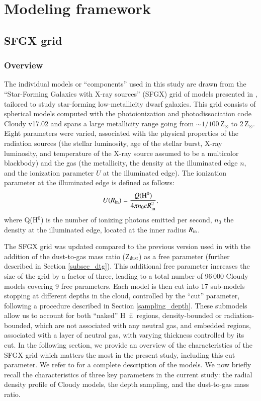 \documentclass{aa}
\newcommand{\hii}{H~{\sc ii}}
\begin{document}
\section{Modeling framework}
\label{section_models}

\subsection{SFGX grid}

\subsubsection{Overview}
\label{subsect_sfgx}

The individual models or “components” used in this study are drawn from the “Star-Forming Galaxies with X-ray sources” (SFGX) grid of models presented in \cite{Ramambason2022}, tailored to study star-forming low-metallicity dwarf galaxies. This grid consists of spherical models computed with the photoionization and photodissociation code Cloudy v17.02 \citep{2017_Cloudy_v17} and spans a large metallicity range going from $\sim 1/100\,$Z$_{\odot}$ to 2\,Z$_{\odot}$. Eight parameters were varied, associated with the physical properties of the radiation sources (the stellar luminosity, age of the stellar burst, X-ray luminosity, and temperature of the X-ray source assumed to be a multicolor blackbody) and the gas (the metallicity, the density at the illuminated edge $n$, and the ionization parameter $U$ at the illuminated edge). The ionization parameter at the illuminated edge is defined as follows:
\begin{equation}
    U(R_{\rm in}) = \frac{Q({\rm H^0})}{4 \pi n_0 c R_{\rm in}^2},
\end{equation}
where Q(H$^0$) is the number of ionizing photons emitted per second, $n_0$ the density at the illuminated edge, located at the inner radius $R_{\rm in}$.

The SFGX grid was updated compared to the previous version used in \cite{Ramambason2022} with the addition of the dust-to-gas mass ratio (Z$_{\rm dust}$) as a free parameter (further described in Section \ref{subsec_dtg}).  This additional free parameter increases the size of the grid by a factor of three, leading to a total number of 96\,000 Cloudy models covering 9 free parameters.
Each model is then cut into 17 sub-models stopping at different depths in the cloud, controlled by the “cut” parameter, following a procedure described in Section \ref{sampling_depth}. These submodels allow us to account for both “naked” \hii\ regions, density-bounded or radiation-bounded, which are not associated with any neutral gas, and embedded regions, associated with a layer of neutral gas, with varying thickness controlled by its cut. In the following section, we provide an overview of the characteristics of the SFGX grid which matters the most in the present study, including this cut parameter. We refer to \cite{Ramambason2022} for a complete description of the models. We now briefly recall the characteristics of three key parameters in the current study: the radial density profile of Cloudy models, the depth sampling, and the dust-to-gas mass ratio.
\end{document}

